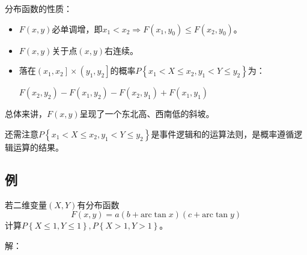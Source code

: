 分布函数的性质：
\begin{itemize}
    \item $F\left( x,y \right) $必单调增，即$x_1<x_2\Rightarrow F\left( x_1,y_0 \right) \leqslant F\left( x_2,y_0 \right) $。
    \item $F\left( x,y \right) $关于点$\left( x,y \right) $右连续。
    \item 落在$\left( x_1,x_2 \right] \times \left( y_1,y_2 \right] $的概率$P\left\{ x_1<X\leqslant x_2,y_1<Y\leqslant y_2 \right\} $为：

	$F\left( x_2,y_2 \right) -F\left( x_1,y_2 \right) -F\left( x_2,y_1 \right) +F\left( x_1,y_1 \right) $
\end{itemize}

总体来讲，$F\left( x,y \right) $呈现了一个东北高、西南低的斜坡。

还需注意$P\left\{ x_1<X\leqslant x_2,y_1<Y\leqslant y_2 \right\} $是事件逻辑和的运算法则，是概率遵循逻辑运算的结果。

\subsection{例}

\begin{example}
若二维变量$\left( X,Y \right) $有分布函数
\[
F\left( x,y \right) =a\left( b+\mathrm{arc}\tan x \right) \left( c+\mathrm{arc}\tan y \right)
\]
计算$P\left\{ X\leqslant 1,Y\leqslant 1 \right\} ,P\left\{ X>1,Y>1 \right\} $。
\end{example}

解：


